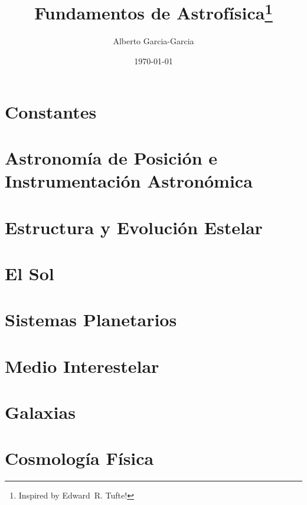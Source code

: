 \documentclass{tufte-handout}
\title{Fundamentos de Astrofísica\thanks{Inspired by Edward~R. Tufte!}}
\author[Alberto Garcia-Garcia]{Alberto Garcia-Garcia}
\date{\today}  %
\begin{document}
\maketitle%

\begin{abstract}
%
\end{abstract}

\tableofcontents

\clearpage

\section{Constantes}

\clearpage

\section{Astronomía de Posición e Instrumentación Astronómica}

\clearpage

\section{Estructura y Evolución Estelar}

\clearpage

\section{El Sol}

\clearpage

\section{Sistemas Planetarios}

\clearpage

\section{Medio Interestelar}

\clearpage

\section{Galaxias}

\clearpage

\section{Cosmología Física}
\end{document}
